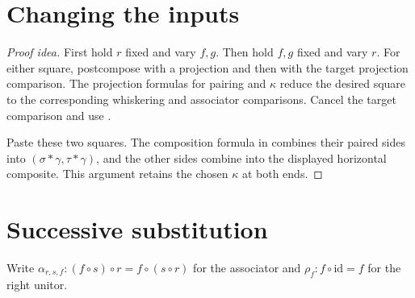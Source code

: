 \documentclass[11pt]{article}
\begin{document}
\section*{Changing the inputs}

\begin{proof}[Proof idea]
First hold $r$ fixed and vary $f,g$. Then hold $f,g$ fixed and vary
$r$. For either square, postcompose with a projection and then with the
target projection comparison. The projection formulas for pairing and
$\kappa$ reduce the desired square to the corresponding whiskering and
associator comparisons. Cancel the target comparison and use
.

Paste these two squares. The composition formula in
 combines their paired sides
into $(\sigma\ast\gamma,\tau\ast\gamma)$, and the other sides combine
into the displayed horizontal composite. This argument retains the
chosen $\kappa$ at both ends.
\end{proof}

\section*{Successive substitution}

Write $\alpha_{r,s,f}\colon(f\circ s)\circ r=f\circ(s\circ r)$
for the associator and $\rho_f\colon f\circ\mathrm{id}=f$ for the
right unitor.
\end{document}
